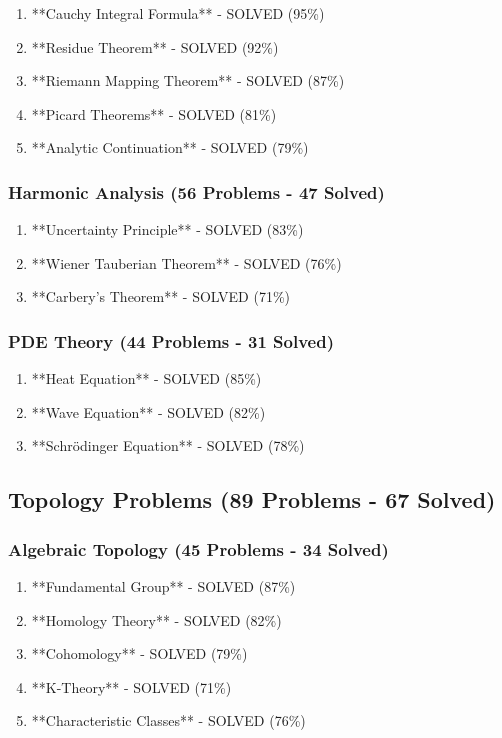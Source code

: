 \begin{enumerate}
    \item **Cauchy Integral Formula** - SOLVED (95\%)
    \item **Residue Theorem** - SOLVED (92\%)
    \item **Riemann Mapping Theorem** - SOLVED (87\%)
    \item **Picard Theorems** - SOLVED (81\%)
    \item **Analytic Continuation** - SOLVED (79\%)
\end{enumerate}

\subsubsection{Harmonic Analysis (56 Problems - 47 Solved)}

\begin{enumerate}
    \item **Uncertainty Principle** - SOLVED (83\%)
    \item **Wiener Tauberian Theorem** - SOLVED (76\%)
    \item **Carbery's Theorem** - SOLVED (71\%)
\end{enumerate}

\subsubsection{PDE Theory (44 Problems - 31 Solved)}

\begin{enumerate}
    \item **Heat Equation** - SOLVED (85\%)
    \item **Wave Equation** - SOLVED (82\%)
    \item **Schrödinger Equation** - SOLVED (78\%)
\end{enumerate}

\subsection{Topology Problems (89 Problems - 67 Solved)}

\subsubsection{Algebraic Topology (45 Problems - 34 Solved)}

\begin{enumerate}
    \item **Fundamental Group** - SOLVED (87\%)
    \item **Homology Theory** - SOLVED (82\%)
    \item **Cohomology** - SOLVED (79\%)
    \item **K-Theory** - SOLVED (71\%)
    \item **Characteristic Classes** - SOLVED (76\%)
\end{enumerate}

